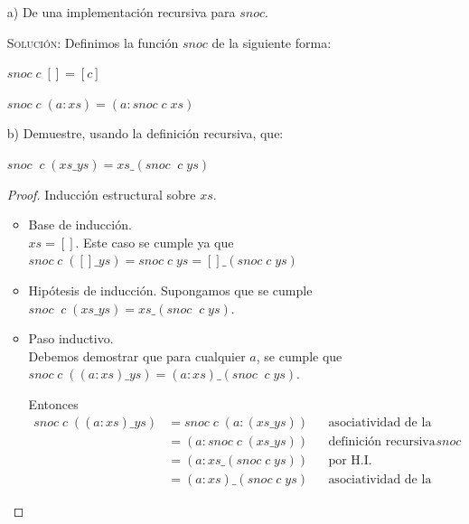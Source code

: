 \documentclass[letterpaper,11pt]{article}
\begin{document}
\begin{enumerate}
    \begin{itemize}
        \item[a)] De una implementación recursiva para $snoc$.

        \textsc{Solución:} Definimos la función $snoc$ de la siguiente forma:
        \begin{center}
            $snoc \; c \; [] = [c]$

            $snoc \; c \; (a:xs) = (a: snoc \; c \; xs)$
        \end{center}

        \item[b)] Demuestre, usando la definición recursiva, que:
        \begin{center}
            $snoc \; \; c \; (xs\_ys) = xs\_ (snoc \; \; c \; ys)$
        \end{center} 

        \begin{proof}
            Inducción estructural sobre $xs$.

            \begin{itemize}
                \item Base de inducción. \\ 
                $xs = []$. Este caso se cumple ya que 
                $snoc \; c \; ([]\_ys) = snoc \; c \; ys = 
                [] \_ (snoc \; c \; ys)$

                \item Hipótesis de inducción. Supongamos que se cumple
                $snoc \; \; c \; (xs\_ys) = xs\_ (snoc \; \; c \; ys)$.

                \item Paso inductivo. \\ 
                Debemos demostrar que para cualquier $a$, se cumple 
                que $snoc \; c \; ((a:xs)\_ys) = 
                (a:xs)\_ (snoc \; \; c \; ys)$.

                Entonces 
                \begin{align*}
                    snoc \; c \; ((a:xs)\_ys)
                    &= snoc \; c \; (a:(xs\_ys))
                    && \text{asociatividad de la concatenación} \\
                    &= (a: snoc \; c \; (xs\_ys)) 
                    && \text{definición recursiva de $snoc$} \\ 
                    &= (a: xs\_(snoc \; c \; ys))
                    && \text{por H.I.} \\ 
                    &= (a : xs)\_(snoc \; c \; ys)
                    && \text{asociatividad de la concatenación} 
                \end{align*}
            \end{itemize}
        \end{proof}
    \end{itemize}


\end{enumerate}
\end{document}
